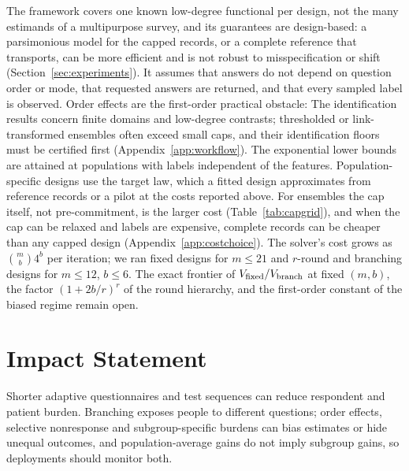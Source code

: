 \documentclass{article}
\begin{document}
The framework covers one known low-degree functional per design, not the many estimands of a multipurpose survey, and its guarantees are design-based: a parsimonious model for the capped records, or a complete reference that transports, can be more efficient and is not robust to misspecification or shift (Section~\ref{sec:experiments}). It assumes that answers do not depend on question order or mode, that requested answers are returned, and that every sampled label is observed. Order effects are the first-order practical obstacle: \nOrderSentence{} The identification results concern finite domains and low-degree contrasts; thresholded or link-transformed ensembles often exceed small caps, and their identification floors must be certified first (Appendix~\ref{app:workflow}). The exponential lower bounds are attained at populations with labels independent of the features. Population-specific designs use the target law, which a fitted design approximates from reference records or a pilot at the costs reported above. For ensembles the cap itself, not pre-commitment, is the larger cost (Table~\ref{tab:capgrid}), and when the cap can be relaxed and labels are expensive, complete records can be cheaper than any capped design (Appendix~\ref{app:costchoice}). The solver's cost grows as $\binom mb4^b$ per iteration; we ran fixed designs for $m\le21$ and $r$-round and branching designs for $m\le12$, $b\le6$. The exact frontier of $V_{\rm fixed}/V_{\rm branch}$ at fixed $(m,b)$, the factor $(1+2b/r)^r$ of the round hierarchy, and the first-order constant of the biased regime remain open.

\section*{Impact Statement}
Shorter adaptive questionnaires and test sequences can reduce respondent and patient burden. Branching exposes people to different questions; order effects, selective nonresponse and subgroup-specific burdens can bias estimates or hide unequal outcomes, and population-average gains do not imply subgroup gains, so deployments should monitor both.



\clearpage
\onecolumn
\raggedbottom
\appendix
{}

\end{document}
